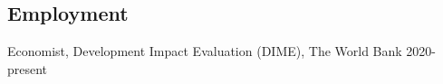 \documentclass[letterpaper, margin, 10pt]{res} %
\begin{document}
\begin{resume}




 




%


\section{\sc \textbf{Employment}}
Economist, Development Impact Evaluation (DIME), The World Bank \hfill{2020-present}


\end{resume}
\end{document}
